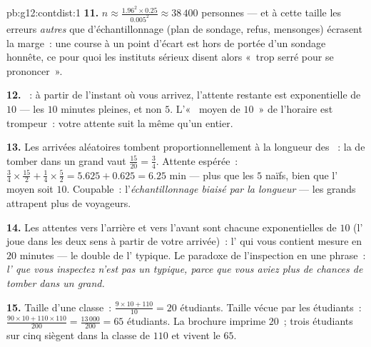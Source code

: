 \begin{solution}{pb:g12:contdist:1}
\textbf{11.} $n \approx \frac{1.96^2 \times 0.25}{0.005^2}
\approx 38\,400$ personnes --- et à cette taille les erreurs
\emph{autres} que d'échantillonnage (plan de sondage, refus,
mensonges) écrasent la marge~: une course à un point d'écart est
hors de portée d'un sondage honnête, ce pour quoi les instituts
sérieux disent alors «~trop serré pour se prononcer~».

\textbf{12.} ~: à partir de l'instant où vous
arrivez, l'attente restante est exponentielle de  $10$ ---
les $10$ minutes pleines, et non $5$. L'«~ moyen de $10$~»
de l'horaire est trompeur~: votre attente suit la même  qu'un
 entier.

\textbf{13.} Les arrivées aléatoires tombent proportionnellement à
la longueur des ~: la  de tomber dans un
grand  vaut $\frac{15}{20} = \frac34$. Attente
espérée~: $\frac34 \times \frac{15}{2} + \frac14 \times
\frac52 = 5.625 + 0.625 = 6.25$ min --- plus que les $5$ naïfs,
bien que l' moyen soit $10$. Coupable~:
l'\emph{échantillonnage biaisé par la longueur} --- les grands
 attrapent plus de voyageurs.

\textbf{14.} Les attentes vers l'arrière et vers l'avant sont
chacune exponentielles de  $10$ (l' joue
dans les deux sens à partir de votre arrivée)~: l' qui
vous contient mesure en  $20$ minutes --- le double de
l' typique. Le paradoxe de l'inspection en une phrase~:
\emph{l' que vous inspectez n'est pas un 
typique, parce que vous aviez plus de chances de tomber dans un
grand.}

\textbf{15.} Taille  d'une classe~:
$\frac{9 \times 10 + 110}{10} = 20$ étudiants. Taille 
vécue par les étudiants~:
$\frac{90 \times 10 + 110 \times 110}{200} = \frac{13\,000}{200} =
65$ étudiants. La brochure imprime $20$~; trois étudiants sur cinq
siègent dans la classe de $110$ et vivent le $65$.


\end{solution}
